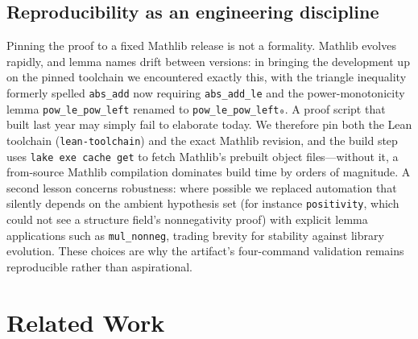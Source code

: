 \documentclass[sigplan,nonacm,screen]{acmart}
\begin{document}
\subsection{Reproducibility as an engineering discipline}
Pinning the proof to a fixed Mathlib release is not a formality. Mathlib evolves
rapidly, and lemma names drift between versions: in bringing the development up on
the pinned toolchain we encountered exactly this, with the triangle inequality
formerly spelled \lstinline[language=lean]|abs_add| now requiring
\lstinline[language=lean]|abs_add_le| and the power-monotonicity lemma
\lstinline[language=lean]|pow_le_pow_left| renamed to
\lstinline[language=lean]|pow_le_pow_left₀|. A proof script that built last year
may simply fail to elaborate today. We therefore pin both the Lean toolchain
(\texttt{lean-toolchain}) and the exact Mathlib revision, and the build step uses
\texttt{lake exe cache get} to fetch Mathlib's prebuilt object files---without it,
a from-source Mathlib compilation dominates build time by orders of magnitude. A
second lesson concerns robustness: where possible we replaced automation that
silently depends on the ambient hypothesis set (for instance
\lstinline[language=lean]|positivity|, which could not see a structure field's
nonnegativity proof) with explicit lemma applications such as
\lstinline[language=lean]|mul_nonneg|, trading brevity for stability against
library evolution. These choices are why the artifact's four-command validation
remains reproducible rather than aspirational.

\section{Related Work}
\label{sec:related}
\end{document}
